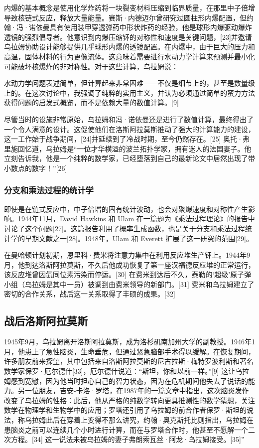 内爆的基本概念是使用化学炸药将一块裂变材料压缩到临界质量，在那里中子倍增导致核链式反应，释放大量能量。赛斯·内德迈尔曾研究过圆柱形内爆配置，但约翰·冯·诺依曼具有使用装甲穿透弹药中形状炸药的经验，他是球形内爆驱动爆炸透镜的强烈倡导者。他意识到内爆压缩钚的对称性和速度是关键问题，[23]并邀请乌拉姆协助设计能够提供几乎球形内爆的透镜配置。在内爆中，由于巨大的压力和高温，固体材料的行为更像流体。这意味着需要进行水动力学计算来预测并最小化可能破坏核爆炸的非对称性。对于这些计算，乌拉姆说：

水动力学问题表述简单，但计算起来非常困难——不仅是细节上的，甚至是数量级上的。在这次讨论中，我强调了纯粹的实用主义，并认为必须通过简单的蛮力方法获得问题的启发式概览，而不是依赖大量的数值计算。[9]

尽管当时的设施非常原始，乌拉姆和冯·诺依曼还是进行了数值计算，最终得出了一个令人满意的设计。这促使他们在洛斯阿拉莫斯推动了强大的计算能力的建设，这一工作始于战争期间，[24]并延续到了冷战时期，至今仍然存在。[25] 奥托·弗里施回忆道，乌拉姆是“一位才华横溢的波兰拓扑学家，拥有迷人的法国妻子。他立刻告诉我，他是一个纯粹的数学家，已经堕落到自己的最新论文中居然出现了带小数点的数字！”[26]
\subsubsection{分支和乘法过程的统计学 } 
即使是在链式反应中，中子倍增的固有统计波动，也会对聚爆速度和对称性产生影响。1944年11月，David Hawkins 和 Ulam 在一篇题为《乘法过程理论》的报告中讨论了这个问题[27]。这篇报告利用了概率生成函数，也是关于分支和乘法过程统计学的早期文献之一[28]。1948年，Ulam 和 Everett 扩展了这一研究的范围[29]。

在曼哈顿计划初期，恩里科·费米将注意力集中在利用反应堆生产钚上。1944年9月，他到达洛斯阿拉莫斯，不久后他成功恢复了第一座汉福德反应堆的正常运行，该反应堆曾因氙同位素污染而停运。[30] 在费米到达后不久，泰勒的‘超级’原子弹小组（乌拉姆是其中一员）被调到由费米领导的新部门。[31] 费米和乌拉姆建立了密切的合作关系，战后这一关系取得了丰硕的成果。[32]
\subsection{战后洛斯阿拉莫斯}  
1945年9月，乌拉姆离开洛斯阿拉莫斯，成为洛杉矶南加州大学的副教授。1946年1月，他患上了急性脑炎，生命垂危，但通过紧急脑部手术得以缓解。在恢复期间，许多朋友前来探望，其中包括来自洛斯阿拉莫斯的尼古拉斯·梅特罗波利斯和著名数学家保罗·厄尔德什[33]，厄尔德什说道：“斯坦，你和以前一样。”[9] 这让乌拉姆感到宽慰，因为他当时担心自己的智力状态，因为在危机期间他失去了说话的能力。另一位朋友，吉安-卡洛·罗塔，在1987年的一篇文章中指出，这次脑炎发作改变了乌拉姆的性格：此后，他从严格的纯数学转向更具推测性的数学猜想，关注数学在物理学和生物学中的应用；罗塔还引用了乌拉姆的前合作者保罗·斯坦的说法，称乌拉姆此后在穿着上变得不那么讲究，约翰·奥克斯托比则指出，乌拉姆在患脑炎之前可以连续几个小时进行计算，而在与罗塔合作时，他甚至不愿解一个二次方程。[34] 这一说法未被乌拉姆的妻子弗朗索瓦丝·阿龙·乌拉姆接受。[35]”